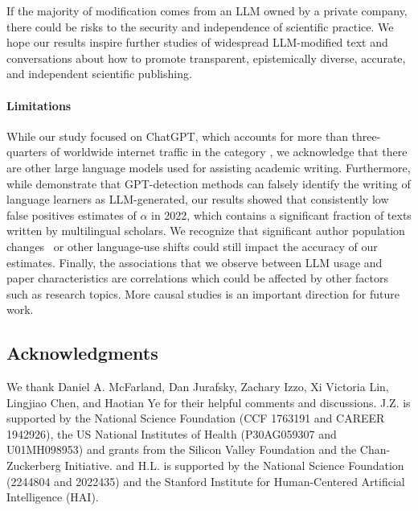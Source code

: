 \documentclass{article}
\begin{document}
   If the majority of modification comes from an LLM owned by a private company, there could be risks to the security and independence of scientific practice. 
  We hope our results inspire 
further studies of widespread LLM-modified text and conversations about how to promote transparent, epistemically diverse, accurate, and independent scientific publishing.
  



\paragraph{Limitations} While our study focused on ChatGPT, which accounts for more than three-quarters of worldwide internet traffic in the category \citep{vanrossum2024generative}, we acknowledge that there are other large language models used for assisting academic writing. 
Furthermore, while \cite{Liang2023GPTDA} demonstrate that GPT-detection methods can falsely identify the writing of language learners as LLM-generated, our results showed that consistently low false positives estimates of $\alpha$ in 2022, which contains a significant fraction of texts written by multilingual scholars. We recognize that significant author population changes~\citep{Globalaitalent} or other language-use shifts could still impact the accuracy of our estimates. Finally, the associations that we observe between LLM usage and paper characteristics are correlations which could be affected by other factors such as research topics. More causal studies is an important direction for future work.




\subsection*{Acknowledgments}
We thank Daniel A. McFarland, Dan Jurafsky, Zachary Izzo, Xi Victoria Lin, Lingjiao Chen, and Haotian Ye for their helpful comments and discussions. J.Z. is supported by the National Science Foundation (CCF 1763191 and CAREER 1942926), the US National Institutes of Health (P30AG059307 and U01MH098953) and grants from the Silicon Valley Foundation and the Chan-Zuckerberg Initiative. and H.L. is supported by the National Science Foundation (2244804 and 2022435) and the Stanford Institute for Human-Centered Artificial Intelligence (HAI). \clearpage
\end{document}
